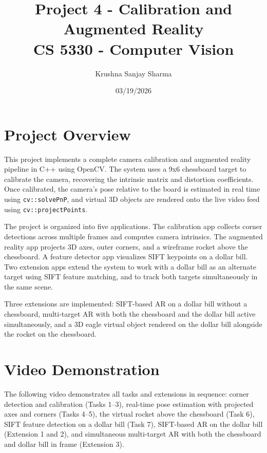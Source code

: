 \documentclass[11pt]{article}
\title{\textbf{Project 4 - Calibration and Augmented Reality} \\
       CS 5330 - Computer Vision}
\author{Krushna Sanjay Sharma}
\date{03/19/2026}
\begin{document}
\maketitle
\tableofcontents
\newpage

\section{Project Overview}

This project implements a complete camera calibration and augmented reality pipeline in C++ using OpenCV. The system uses a 9x6 chessboard target to calibrate the camera, recovering the intrinsic matrix and distortion coefficients. Once calibrated, the camera's pose relative to the board is estimated in real time using \texttt{cv::solvePnP}, and virtual 3D objects are rendered onto the live video feed using \texttt{cv::projectPoints}.

The project is organized into five applications. The calibration app collects corner detections across multiple frames and computes camera intrinsics. The augmented reality app projects 3D axes, outer corners, and a wireframe rocket above the chessboard. A feature detector app visualizes SIFT keypoints on a dollar bill. Two extension apps extend the system to work with a dollar bill as an alternate target using SIFT feature matching, and to track both targets simultaneously in the same scene.

Three extensions are implemented: SIFT-based AR on a dollar bill without a chessboard, multi-target AR with both the chessboard and the dollar bill active simultaneously, and a 3D eagle virtual object rendered on the dollar bill alongside the rocket on the chessboard.

\newpage

\section{Video Demonstration}

The following video demonstrates all tasks and extensions in sequence: corner detection and calibration (Tasks 1--3), real-time pose estimation with projected axes and corners (Tasks 4--5), the virtual rocket above the chessboard (Task 6), SIFT feature detection on a dollar bill (Task 7), SIFT-based AR on the dollar bill (Extension 1 and 2), and simultaneous multi-target AR with both the chessboard and dollar bill in frame (Extension 3).
\end{document}
